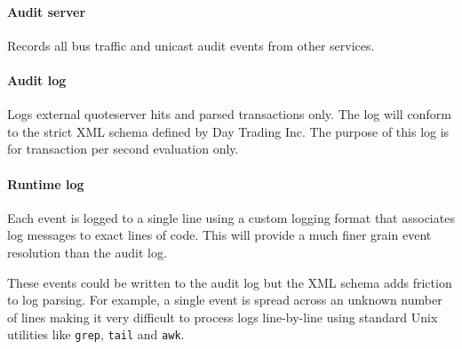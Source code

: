 \paragraph{Audit server}
Records all bus traffic and unicast audit events from other services.

\paragraph{Audit log}
Logs external quoteserver hits and parsed transactions only. The log will conform to the strict XML schema defined by Day Trading Inc. The purpose of this log is for transaction per second evaluation only.

\paragraph{Runtime log}
Each event is logged to a single line using a custom logging format that associates log messages to exact lines of code. This will provide a much finer grain event resolution than the audit log.

These events could be written to the audit log but the XML schema adds friction to log parsing. For example, a single event is spread across an unknown number of lines making it very difficult to process logs line-by-line using standard Unix utilities like \texttt{grep}, \texttt{tail} and \texttt{awk}.
